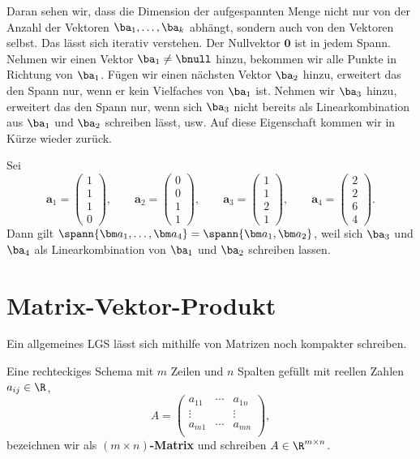 Daran sehen wir, dass die Dimension der aufgespannten Menge nicht nur von der Anzahl der Vektoren $\ba_1, \dots, \ba_k$ abhängt, sondern auch von den Vektoren selbst. Das lässt sich iterativ verstehen. Der Nullvektor $\bm 0$ ist in jedem Spann. Nehmen wir einen Vektor $\ba_1 \neq \bnull$ hinzu, bekommen wir alle Punkte in Richtung von $\ba_1$. Fügen wir einen nächsten Vektor $\ba_2$ hinzu, erweitert das den Spann nur, wenn er kein Vielfaches von $\ba_1$ ist. Nehmen wir $\ba_3$ hinzu, erweitert das den Spann nur, wenn sich $\ba_3$ nicht bereits als Linearkombination aus $\ba_1$ und $\ba_2$ schreiben lässt, usw. Auf diese Eigenschaft kommen wir in Kürze wieder zurück.

\begin{example}

	Sei
	$$ \bm a_1 = \begin{pmatrix}
			1 \\ 1 \\ 1 \\ 0
		\end{pmatrix}, \qquad
		\bm a_2 = \begin{pmatrix}
			0 \\ 0 \\ 1 \\ 1
		\end{pmatrix},  \qquad
		\bm a_3 = \begin{pmatrix}
			1 \\ 1 \\ 2 \\ 1
		\end{pmatrix}, \qquad
		\bm a_4 = \begin{pmatrix}
			2 \\ 2 \\ 6 \\ 4
		\end{pmatrix}.$$
	Dann gilt $\spann\{\bm a_1, \dots, \bm a_4\} = \spann\{\bm a_1, \bm a_2\}$, weil sich $\ba_3$ und $\ba_4$ als Linearkombination von $\ba_1$ und $\ba_2$ schreiben lassen.
\end{example}


\section{Matrix-Vektor-Produkt}

Ein allgemeines LGS lässt sich mithilfe von Matrizen noch kompakter schreiben.

\begin{definition}
	Eine rechteckiges Schema mit $m$ Zeilen und $n$ Spalten gefüllt mit reellen Zahlen $a_{ij} \in \R$,
	$$A = \begin{pmatrix}
			a_{11} & \cdots & a_{1n} \\
			\vdots &        & \vdots \\
			a_{m1} & \cdots & a_{mn} \\
		\end{pmatrix},$$
	bezeichnen wir als \textbf{$(m \times n)$-Matrix} und schreiben $A \in \R^{m \times n}$.
\end{definition}

